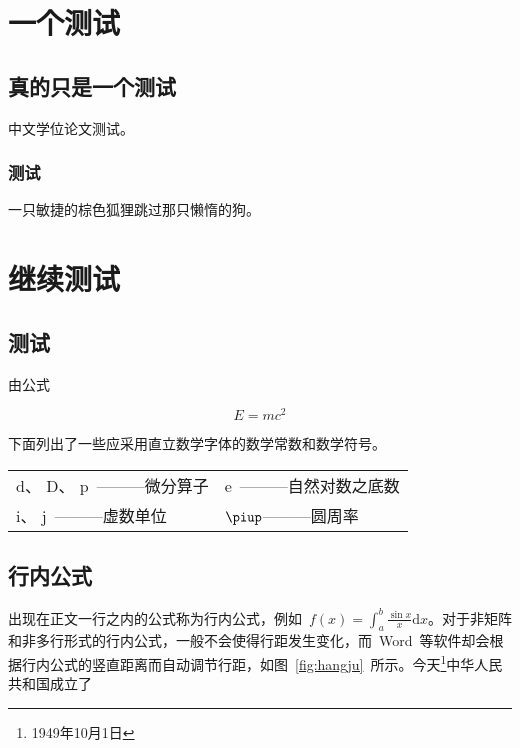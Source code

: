 

\chapter{一个测试}

\section{真的只是一个测试}

中文学位论文测试。

\subsection{测试}

一只敏捷的棕色狐狸跳过那只懒惰的狗。

\chapter{继续测试}

\section{测试}

由公式

\[E = mc^2\]

\noindent 下面列出了一些应采用直立数学字体的数学常数和数学符号。

\vspace{-0.5em}
\begin{center}
\begin{tabularx}{0.7\textwidth}{XX}
$\mathrm{d}$、 $\mathrm{D}$、 $\mathrm{p}$~———微分算子 & $\mathrm{e}$~———自然对数之底数 \\
$\mathrm{i}$、 $\mathrm{j}$~———虚数单位 & $\piup$———圆周率\\
\end{tabularx}
\end{center}

\section{行内公式}

出现在正文一行之内的公式称为行内公式，例如~$f(x)=\int_{a}^{b}\frac{\sin{x}}{x}\mathrm{d}x$。对于非矩阵和非多行形式的行内公式，一般不会使得行距发生变化，而~Word~等软件却会根据行内公式的竖直距离而自动调节行距，如图~\ref{fig:hangju}~所示。今天\footnote[5]{1949年10月1日}中华人民共和国成立了

